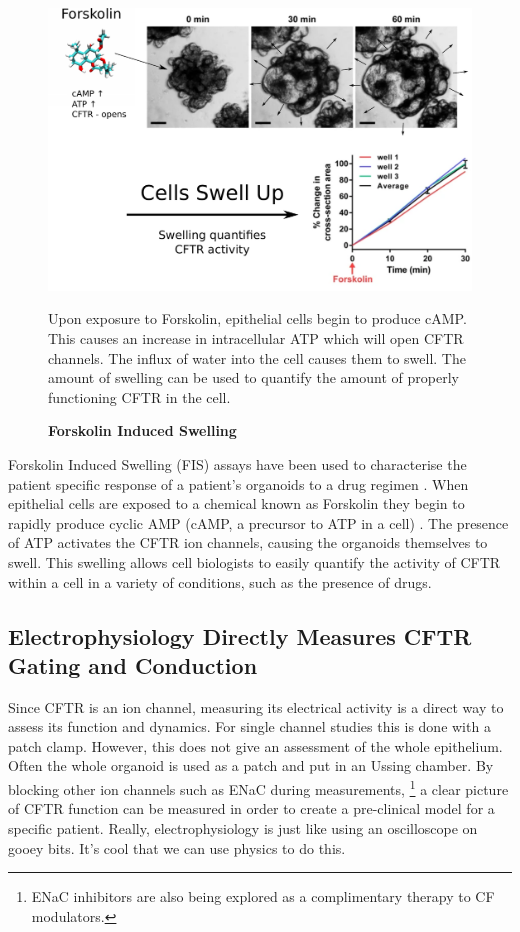 \begin{figure}
	\label{western_blot}
	\begin{center}
	\includegraphics[width=1\textwidth]{figures/FIS_demo.pdf}
	\end{center}
	\captionsetup{singlelinecheck = false, justification=raggedright}
	\caption[Forskolin Induced Swelling] {\textbf{Forskolin Induced Swelling}}{Upon exposure to Forskolin, epithelial cells begin to produce cAMP. This causes an increase in intracellular ATP which will open CFTR channels. The influx of water into the cell causes them to swell. The amount of swelling can be used to quantify the amount of properly functioning CFTR in the cell.} 
\end{figure}
Forskolin Induced Swelling (FIS) assays have been used to characterise the patient specific response of a patient's organoids to a drug regimen \cite{dekkers2013}. When epithelial cells are exposed to a chemical known as Forskolin they begin to rapidly produce cyclic AMP (cAMP, a precursor to ATP in a cell) \cite{bonora2012}. The presence of ATP activates the CFTR ion channels, causing the organoids themselves to swell. This swelling allows cell biologists to easily quantify the activity of CFTR within a cell in a variety of conditions, such as the presence of drugs.

\subsection{Electrophysiology Directly Measures CFTR Gating and Conduction}
Since CFTR is an ion channel, measuring its electrical activity is a direct way to assess its function and dynamics. For single channel studies this is done with a patch clamp. However, this does not give an assessment of the whole epithelium. Often the whole organoid is used as a patch and put in an Ussing chamber. By blocking other ion channels such as ENaC during measurements, \footnote{ENaC inhibitors are also being explored as a complimentary therapy to CF modulators\cite{mall2020}.} a clear picture of CFTR function can be measured in order to create a pre-clinical model for a specific patient. Really, electrophysiology is just like using an oscilloscope on gooey bits. It's cool that we can use physics to do this. 

